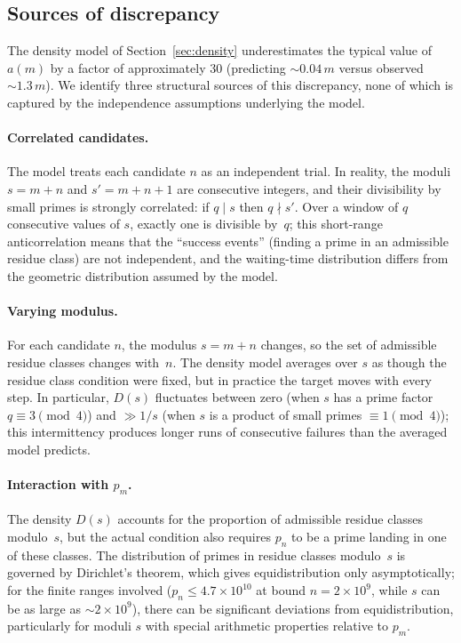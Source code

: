 \documentclass[pdflatex,sn-mathphys-num,Numbered]{sn-jnl}
\theoremstyle{thmstyleone}
\theoremstyle{thmstylethree}
\theoremstyle{thmstyletwo}
\numberwithin{equation}{section}
\begin{document}
\subsection{Sources of discrepancy}
\label{sec:discrepancy}

The density model of Section~\ref{sec:density} underestimates the
typical value of $a(m)$ by a factor of approximately $30$
(predicting $\sim 0.04\,m$ versus observed $\sim 1.3\,m$).
We identify three structural sources of this discrepancy, none of
which is captured by the independence assumptions underlying the
model.

\paragraph{Correlated candidates.}
The model treats each candidate $n$ as an independent trial.
In reality, the moduli $s = m + n$ and $s' = m + n + 1$ are
consecutive integers, and their divisibility by small primes is
strongly correlated: if $q \mid s$ then $q \nmid s'$.
Over a window of $q$ consecutive values of $s$, exactly one is
divisible by~$q$; this short-range anticorrelation means that the
``success events'' (finding a prime in an admissible residue class)
are not independent, and the waiting-time distribution differs from
the geometric distribution assumed by the model.

\paragraph{Varying modulus.}
For each candidate $n$, the modulus $s = m + n$ changes, so the set
of admissible residue classes changes with~$n$.
The density model averages over $s$ as though the residue class
condition were fixed, but in practice the target moves with every
step.
In particular, $D(s)$ fluctuates between zero (when $s$ has a prime
factor $q \equiv 3 \pmod{4}$) and $\gg 1/s$ (when $s$ is a product
of small primes $\equiv 1 \pmod{4}$); this intermittency produces
longer runs of consecutive failures than the averaged model predicts.

\paragraph{Interaction with $p_m$.}
The density $D(s)$ accounts for the proportion of admissible residue
classes modulo~$s$, but the actual condition also requires $p_n$ to
be a prime landing in one of these classes.
The distribution of primes in residue classes modulo~$s$ is governed
by Dirichlet's theorem, which gives equidistribution only
asymptotically; for the finite ranges involved
($p_n \leq 4.7 \times 10^{10}$ at bound $n = 2 \times 10^9$,
while $s$ can be as large as $\sim 2 \times 10^9$), there can be
significant deviations from equidistribution, particularly for
moduli $s$ with special arithmetic properties relative to $p_m$.
\end{document}
